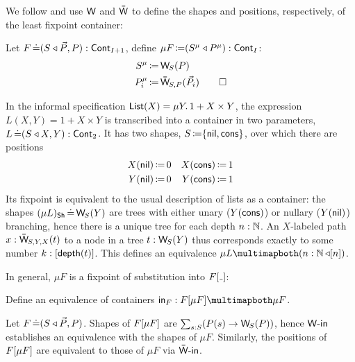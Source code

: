 We follow \cites[\S~5]{AbbottEtAl2005ContainersConstructingstrictly}[\S~7]{AbbottEtAl2005DataDifferentiating} and
use \( \W \) and \( \WPath \) to define the shapes and positions, respectively, of the least fixpoint container:
\begin{definition}
  Let \( F \operatorname{\mathrel{\doteq}} (S\mathbin{\triangleleft}\vec{P},P) : \operatorname{\mathsf{Cont}}_{I+1} \), define \( {\mu F} \operatorname{\mathrel{\coloneq}} (S^\mu\mathbin{\triangleleft}P^\mu) : \operatorname{\mathsf{Cont}}_{I} \):
  \begin{align*}
    S^\mu &\DefEq \W_{S}(P) \\
    P^\mu_i & \DefEq \WPath_{S,P}(\vec{P}_i)
    \qedhere
  \end{align*}
\end{definition}

\begin{example}
  \newcommand*{\Nil}{\Op{nil}}
  \newcommand*{\Cons}{\Op{cons}}
  In the informal specification \( \mathsf{List}(X) = \mu Y.\, 1 + X \times Y \),
  the expression \( L(X, Y) = 1 + X \times Y \) is transcribed into a container in two parameters, \( L \operatorname{\mathrel{\doteq}} (S\mathbin{\triangleleft}X, Y) : \operatorname{\mathsf{Cont}}_2 \).
  It has two shapes, \( S \DefEq \{ \Nil,  \Cons \} \),
  over which there are positions
  \begin{align*}
    X(\Nil) &\DefEq 0 & X(\Cons) &\DefEq 1 \\
    Y(\Nil) &\DefEq 0 & Y(\Cons) &\DefEq 1
  \end{align*}
  Its fixpoint is equivalent to the usual description of lists as a container:
  the shapes \( ({\mu L})_{\Sh} \JudgeEq \W_{S}(Y) \)
  are trees with either unary (\( Y(\Cons) \)) or nullary (\( Y(\Nil) \))
  branching, hence there is a unique tree for each depth \( n : \operatorname{\mathbb{N}} \).
  An \( X \)-labeled path \( x : \WPath_{S, Y, X}(t) \) to a node in a tree \( t : \W_{S}(Y) \)
  thus corresponds exactly to some number \( k : \lbrack\mathsf{depth}(t)\rbrack \).
  This defines an equivalence \( \mu L \CartEquiv (\MkCont{n : \Nat}{\Fin{n}}) \).
\end{example}

In general, \( \mu F \) is a fixpoint of substitution into \( \Subst{F}{\Blank} \):
\begin{problem}
  Define an equivalence of containers \( \In_F : F[{\mu F}] \CartEquiv {\mu F} \).
  \begin{construction}
    Let \( F \operatorname{\mathrel{\doteq}} (S\mathbin{\triangleleft}\vec{P},P) \).
    Shapes of \( F\lbrack\mu F\rbrack \) are \( \sum_{s : S} (P(s) \to \W_{S}(P)) \),
    hence \( \operatorname{\mathsf{W-in}} \) establishes an equivalence with the shapes of \( \mu F \).
    Similarly, the positions of \( F\lbrack\mu F\rbrack \) are equivalent to those of \( \mu F \) via \( \operatorname{\mathsf{\bar{W}-in}} \).
  \end{construction}
\end{problem}

